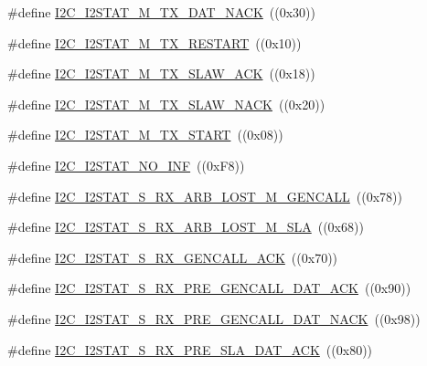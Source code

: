 \begin{DoxyCompactItemize}
\item 
\#define \hyperlink{group__I2C__17XX__40XX_ga234f86990a6fd63f1d2064cbca4709a3}{I2\+C\+\_\+\+I2\+S\+T\+A\+T\+\_\+\+M\+\_\+\+T\+X\+\_\+\+D\+A\+T\+\_\+\+N\+A\+CK}~((0x30))
\item 
\#define \hyperlink{group__I2C__17XX__40XX_gad41d0d1392b7d905b22b9c5015f2e48f}{I2\+C\+\_\+\+I2\+S\+T\+A\+T\+\_\+\+M\+\_\+\+T\+X\+\_\+\+R\+E\+S\+T\+A\+RT}~((0x10))
\item 
\#define \hyperlink{group__I2C__17XX__40XX_gab91c158252efeb1a3a139faec3622ae0}{I2\+C\+\_\+\+I2\+S\+T\+A\+T\+\_\+\+M\+\_\+\+T\+X\+\_\+\+S\+L\+A\+W\+\_\+\+A\+CK}~((0x18))
\item 
\#define \hyperlink{group__I2C__17XX__40XX_ga15729d9436fbf4c23a22e7cdbc913552}{I2\+C\+\_\+\+I2\+S\+T\+A\+T\+\_\+\+M\+\_\+\+T\+X\+\_\+\+S\+L\+A\+W\+\_\+\+N\+A\+CK}~((0x20))
\item 
\#define \hyperlink{group__I2C__17XX__40XX_ga5c44c05176052f6040cd40d680bc2a91}{I2\+C\+\_\+\+I2\+S\+T\+A\+T\+\_\+\+M\+\_\+\+T\+X\+\_\+\+S\+T\+A\+RT}~((0x08))
\item 
\#define \hyperlink{group__I2C__17XX__40XX_ga3e2ecdeb466041bb3cf435ccf36564d9}{I2\+C\+\_\+\+I2\+S\+T\+A\+T\+\_\+\+N\+O\+\_\+\+I\+NF}~((0x\+F8))
\item 
\#define \hyperlink{group__I2C__17XX__40XX_ga1605c253472e071e7f77e51bda156ba7}{I2\+C\+\_\+\+I2\+S\+T\+A\+T\+\_\+\+S\+\_\+\+R\+X\+\_\+\+A\+R\+B\+\_\+\+L\+O\+S\+T\+\_\+\+M\+\_\+\+G\+E\+N\+C\+A\+LL}~((0x78))
\item 
\#define \hyperlink{group__I2C__17XX__40XX_gaf13df6ed7d10be0e063bcbc04d329749}{I2\+C\+\_\+\+I2\+S\+T\+A\+T\+\_\+\+S\+\_\+\+R\+X\+\_\+\+A\+R\+B\+\_\+\+L\+O\+S\+T\+\_\+\+M\+\_\+\+S\+LA}~((0x68))
\item 
\#define \hyperlink{group__I2C__17XX__40XX_gadcab34e87ad115c011e23a5bd4fb8aa3}{I2\+C\+\_\+\+I2\+S\+T\+A\+T\+\_\+\+S\+\_\+\+R\+X\+\_\+\+G\+E\+N\+C\+A\+L\+L\+\_\+\+A\+CK}~((0x70))
\item 
\#define \hyperlink{group__I2C__17XX__40XX_ga75dd46ddb054c4d47a531b8e90f7f446}{I2\+C\+\_\+\+I2\+S\+T\+A\+T\+\_\+\+S\+\_\+\+R\+X\+\_\+\+P\+R\+E\+\_\+\+G\+E\+N\+C\+A\+L\+L\+\_\+\+D\+A\+T\+\_\+\+A\+CK}~((0x90))
\item 
\#define \hyperlink{group__I2C__17XX__40XX_ga20c65f8a82c18211127e5c335026bd76}{I2\+C\+\_\+\+I2\+S\+T\+A\+T\+\_\+\+S\+\_\+\+R\+X\+\_\+\+P\+R\+E\+\_\+\+G\+E\+N\+C\+A\+L\+L\+\_\+\+D\+A\+T\+\_\+\+N\+A\+CK}~((0x98))
\item 
\#define \hyperlink{group__I2C__17XX__40XX_ga4342227592c3e2e345517bd3e6cd8089}{I2\+C\+\_\+\+I2\+S\+T\+A\+T\+\_\+\+S\+\_\+\+R\+X\+\_\+\+P\+R\+E\+\_\+\+S\+L\+A\+\_\+\+D\+A\+T\+\_\+\+A\+CK}~((0x80))

\end{DoxyCompactItemize}
